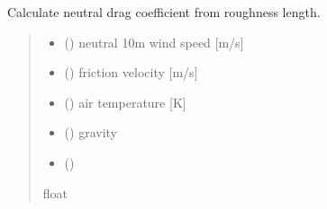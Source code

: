 \documentclass[letterpaper,10pt,english]{sphinxmanual}
\begin{document}

\begin{fulllineitems}
\label{\detokenize{users_guide:AirSeaFluxCode.flux_subs.drag_coef.cdn_from_roughness}}
\pysigstartsignatures
{}
\pysigstopsignatures
\sphinxAtStartPar
Calculate neutral drag coefficient from roughness length.
\begin{quote}\begin{description}
\begin{itemize}
\item {} 
\sphinxAtStartPar
{} () \textendash{} neutral 10m wind speed {[}m/s{]}

\item {} 
\sphinxAtStartPar
{} () \textendash{} friction velocity      {[}m/s{]}

\item {} 
\sphinxAtStartPar
{} () \textendash{} air temperature        {[}K{]}

\item {} 
\sphinxAtStartPar
{} (\sphinxstyleliteralemphasis{\sphinxupquote{                {[}}}\sphinxstyleliteralemphasis{\sphinxupquote{{]}}}) \textendash{} gravity

\item {} 
\sphinxAtStartPar
{} () \textendash{} 

\end{itemize}

\sphinxAtStartPar
{}

\sphinxAtStartPar
float

\end{description}\end{quote}

\end{fulllineitems}
\end{document}
